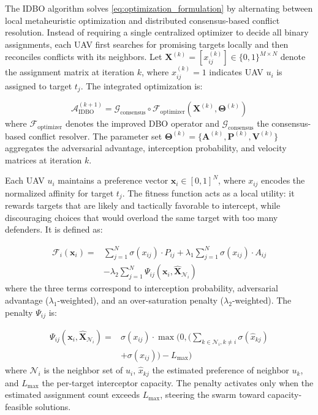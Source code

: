 \documentclass[lettersize,journal]{IEEEtran}
\begin{document}
The IDBO algorithm solves \eqref{eq:optimization_formulation} by alternating between local metaheuristic optimization and distributed consensus-based conflict resolution. Instead of requiring a single centralized optimizer to decide all binary assignments, each UAV first searches for promising targets locally and then reconciles conflicts with its neighbors. Let $\mathbf{X}^{(k)} = [x_{ij}^{(k)}] \in \{0,1\}^{M \times N}$ denote the assignment matrix at iteration $k$, where $x_{ij}^{(k)}=1$ indicates UAV $u_i$ is assigned to target $t_j$. The integrated optimization is:

\begin{equation}
\label{eq:hierarchical}
\mathcal{A}_{\text{IDBO}}^{(k+1)} = \mathcal{G}_{\text{consensus}} \circ \mathcal{F}_{\text{optimizer}} \left( \mathbf{X}^{(k)}, \boldsymbol{\Theta}^{(k)} \right)
\end{equation}
where $\mathcal{F}_{\text{optimizer}}$ denotes the improved DBO operator and $\mathcal{G}_{\text{consensus}}$ the consensus-based conflict resolver. The parameter set $\boldsymbol{\Theta}^{(k)} = \{\mathbf{A}^{(k)}, \mathbf{P}^{(k)}, \mathbf{V}^{(k)}\}$ aggregates the adversarial advantage, interception probability, and velocity matrices at iteration $k$.

Each UAV $u_i$ maintains a preference vector $\mathbf{x}_i \in [0,1]^{N}$, where $x_{ij}$ encodes the normalized affinity for target $t_j$. The fitness function acts as a local utility: it rewards targets that are likely and tactically favorable to intercept, while discouraging choices that would overload the same target with too many defenders. It is defined as:

\begin{equation}
\label{eq:idbo_fitness}
\begin{split}
\mathcal{F}_i(\mathbf{x}_i) =& \sum_{j=1}^{N} \sigma(x_{ij}) \cdot P_{ij} + \lambda_1 \sum_{j=1}^{N} \sigma(x_{ij}) \cdot A_{ij} \\
&- \lambda_2 \sum_{j=1}^{N} \Psi_{ij}(\mathbf{x}_i, \hat{\mathbf{X}}_{\mathcal{N}_i})
\end{split}
\end{equation}
where the three terms correspond to interception probability, adversarial advantage ($\lambda_1$-weighted), and an over-saturation penalty ($\lambda_2$-weighted). The penalty $\Psi_{ij}$ is:

\begin{equation}
\label{eq:saturation_penalty}
\begin{split}
\Psi_{ij}(\mathbf{x}_i, \hat{\mathbf{X}}_{\mathcal{N}_i}) =& \sigma(x_{ij}) \cdot \max\Biggl(0, \Biggl(\sum_{k \in \mathcal{N}_i, k \neq i} \sigma(\hat{x}_{kj}) \\
&+ \sigma(x_{ij})\Biggr) - L_{\max}\Biggr)
\end{split}
\end{equation}
where $\mathcal{N}_i$ is the neighbor set of $u_i$, $\hat{x}_{kj}$ the estimated preference of neighbor $u_k$, and $L_{\max}$ the per-target interceptor capacity. The penalty activates only when the estimated assignment count exceeds $L_{\max}$, steering the swarm toward capacity-feasible solutions.
\end{document}
